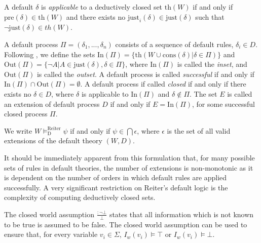 A default $\delta$ is \textit{applicable} to a deductively closed set $\text{th}(W)$ if and only if $\text{pre}(\delta) \in \text{th}(W)$ and there exists no $\text{just}_i(\delta) \in \text{just}(\delta)$ such that $\lnot \text{just}(\delta) \in th(W)$.

A default process $\Pi=(\delta_1,...,\delta_n)$ consists of a sequence of default rules, $\delta_i\in D$. Following \cite{ragni2017formal}, we define the sets $\text{In}(\Pi)=\{\text{th}(W \cup \text{cons}(\delta)|\delta \in \Pi)\}$ and $\text{Out}(\Pi)=\{\lnot A|A \in \text{just}(\delta), \delta \in \Pi\}$, where $\text{In}(\Pi)$ is called the \textit{inset}, and $\text{Out}(\Pi)$ is called the \textit{outset}. A default process is called \textit{successful} if and only if $\text{In}(\Pi)\cap \text{Out}(\Pi)=\emptyset$. A default process if called \textit{closed} if and only if there exists no $\delta \in D$, where $\delta$ is applicable to $\text{In}(\Pi)$ and $\delta \not\in \Pi$. The set $E$ is called an extension of default process $D$ if and only if $E=\text{In}(\Pi)$, for some successful closed process $\Pi$. 

We write $W\models_\text{D}^\text{Reiter} \psi$ if and only if $\psi \in \bigcap \epsilon$, where $\epsilon$ is the set of all valid extensions of the default theory $(W,D)$.


It should be immediately apparent from this formulation that, for many possible sets of rules in default theories, the number of extensions is non-monotonic as it is dependent on the number of orders in which default rules are applied successfully. A very significant restriction on Reiter's default logic is the complexity of computing deductively closed sets.

The closed world assumption $\frac{: \lnot \bot}{\bot}$ states that all information which is not known to be true is assumed to be false. The closed world assumption can be used to ensure that, for every variable $v_i \in \Sigma$, $I_w(v_i) \models \top$ or $I_w(v_i) \models \bot$.



